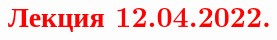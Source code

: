 \documentclass[main.tex]{subfiles}
\begin{document}
\section{\textcolor{red}{Лекция 12.04.2022.}}
\end{document}
